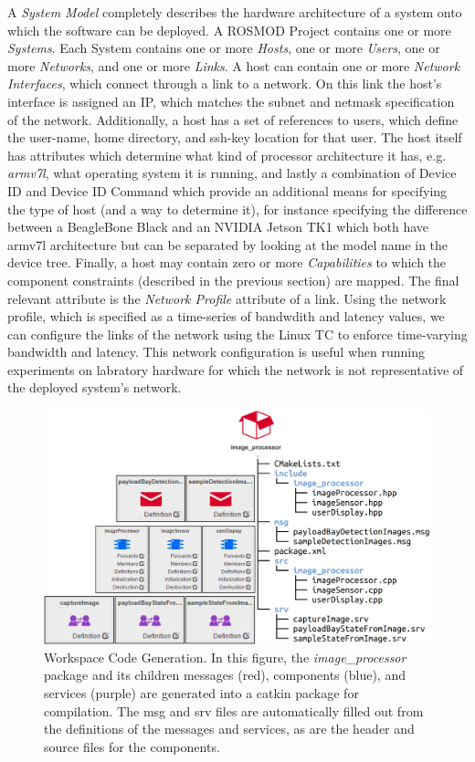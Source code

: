 A \emph{System Model} completely describes the hardware architecture
of a system onto which the software can be deployed. A ROSMOD Project
contains one or more \emph{Systems}. Each System contains one or
more \emph{Hosts}, one or more \emph{Users}, one or more
\emph{Networks}, and one or more \emph{Links}.  A host can contain one
or more \emph{Network Interfaces}, which connect through a link to a
network.  On this link the host's interface is assigned an IP, which
matches the subnet and netmask specification of the network.
Additionally, a host has a set of references to users, which define
the user-name, home directory, and ssh-key location for that user.
The host itself has attributes which determine what kind of processor
architecture it has, e.g. \emph{armv7l}, what operating system it is
running, and lastly a combination of Device ID and Device ID Command
which provide an additional means for specifying the type of host (and
a way to determine it), for instance specifying the difference between
a BeagleBone Black and an NVIDIA Jetson TK1 which both have armv7l
architecture but can be separated by looking at the model name in the
device tree.  Finally, a host may contain zero or more
\emph{Capabilities} to which the component constraints (described in
the previous section) are mapped.  The final relevant attribute is the
\emph{Network Profile} attribute of a link.  Using the network
profile, which is specified as a time-series of bandwdith and latency
values, we can configure the links of the network using the Linux TC
to enforce time-varying bandwidth and latency.  This network
configuration is useful when running experiments on labratory hardware
for which the network is not representative of the deployed system's
network.

\begin{figure}[h]
	\centering
        \includegraphics[width=\textwidth]{./Figures/Code_Generation.png}
	\caption{Workspace Code Generation.  In this figure, the
          \emph{image\_processor} package and its children messages
          (red), components (blue), and services (purple) are
          generated into a catkin package for compilation.  The msg
          and srv files are automatically filled out from the
          definitions of the messages and services, as are the header
          and source files for the components.}
	\label{fig:Code_Generation}
\end{figure}

